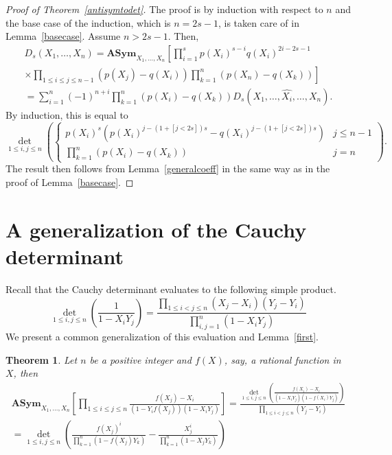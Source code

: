 \documentclass[12pt,dvipsnames]{amsart}
\newtheorem{theorem}{Theorem}
\theoremstyle{definition}
\newcommand{\asym}{\mathbf{ASym}}
\begin{document}
\begin{proof}[Proof of Theorem~\ref{antisymtodet}]
The proof is by induction with respect to $n$ and the base case of the induction, which is $n=2s-1$, is taken care of in Lemma~\ref{basecase}. Assume 
$n>2s-1$. Then, 
\begin{multline*}
D_s(X_1,\ldots,X_n) =  \asym_{X_1,\ldots,X_n} \left[ \prod_{i=1}^s p(X_i)^{s-i} q(X_i)^{2i-2s-1} \right. \\
\left. \times 
\prod_{1 \le i \le j \le n-1} (p(X_j)-q(X_i)) \prod_{k=1}^n (p(X_n)-q(X_k)) \right] \\
= \sum_{i=1}^{n} (-1)^{n+i} \prod_{k=1}^n (p(X_i)-q(X_k)) D_s(X_1,\ldots,\widehat{X_i},\ldots,X_n). 
\end{multline*} 
By induction, this is equal to 
$$
\det_{1 \le i, j \le n}
\left( \begin{cases} p(X_i)^s \left( p(X_i)^{j-(1+[j<2s])s}-q(X_i)^{j-(1+[j<2s])s} \right)  & j \le n-1 \\
         \prod_{k=1}^n \left( p(X_i)-q(X_k) \right) & j=n \end{cases} \right).
$$
The result then follows from Lemma~\ref{generalcoeff} in the same way as in the proof of Lemma~\ref{basecase}. \end{proof} 


\section{A generalization of the Cauchy determinant}
\label{cauchysec} 

Recall that the Cauchy determinant evaluates to the following simple product.
\begin{equation}
\label{cauchy}  
\det_{1 \le i,j \le n} \left( \frac{1}{1-X_i Y_j} \right) = \frac{\prod_{1 \le i < j \le n} (X_j-X_i)(Y_j-Y_i)}{\prod_{i,j=1}^n (1-X_i Y_j)}
\end{equation} 
We present a common generalization of this evaluation and Lemma~\ref{first}.

\begin{theorem} 
\label{cauchyg} Let $n$ be a positive integer and $f(X)$, say, a rational function in $X$, then
\begin{multline*} 
\asym_{X_1,\ldots,X_n} \left[ \prod\limits_{1 \le i \le j \le n} \frac{f(X_j)-X_i}{(1-Y_i f(X_j))(1-X_i Y_j)} \right] = 
\frac{\det_{1 \le i, j \le n} \left(\frac{f(X_i)-X_i}{(1-X_i Y_j)(1-f(X_i)Y_j)}\right)}{\prod_{1 \le i < j \le n}(Y_j-Y_i)} \\
= \det_{1 \le i, j \le n} \left( \frac{f(X_j)^i}{\prod_{k=1}^n (1-f(X_j)Y_k)} - \frac{X_j^i}{\prod_{k=1}^n (1-X_jY_k)} \right)
\end{multline*} 
\end{theorem}  
\end{document}
